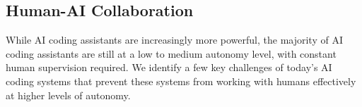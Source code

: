 





\vspace{-0.2cm}

\subsection{Human-AI Collaboration} \label{sec:c-hai-colab}

\vspace{-0.1cm}

While AI coding assistants are increasingly more powerful, the majority of AI coding assistants are still at a low to medium autonomy level, with constant human supervision required. We identify a few key challenges of today's AI coding systems that prevent these systems from working with humans effectively at higher levels of autonomy.

